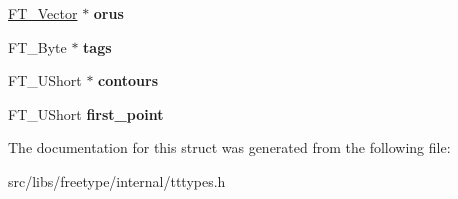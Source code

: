 \begin{DoxyCompactItemize}
\item 
\hypertarget{struct_t_t___glyph_zone_rec___a4b4193dbae177435cb6515f9a0537fa0}{
\hyperlink{struct_f_t___vector__}{FT\_\-Vector} $\ast$ {\bfseries orus}}
\label{struct_t_t___glyph_zone_rec___a4b4193dbae177435cb6515f9a0537fa0}

\item 
\hypertarget{struct_t_t___glyph_zone_rec___ae816c5c1096e333741d3f3f9d3ae0a8f}{
FT\_\-Byte $\ast$ {\bfseries tags}}
\label{struct_t_t___glyph_zone_rec___ae816c5c1096e333741d3f3f9d3ae0a8f}

\item 
\hypertarget{struct_t_t___glyph_zone_rec___ad16498cac0d4d233dce009eb74d63de1}{
FT\_\-UShort $\ast$ {\bfseries contours}}
\label{struct_t_t___glyph_zone_rec___ad16498cac0d4d233dce009eb74d63de1}

\item 
\hypertarget{struct_t_t___glyph_zone_rec___a9d655be80b3e31652f69ede54458faaf}{
FT\_\-UShort {\bfseries first\_\-point}}
\label{struct_t_t___glyph_zone_rec___a9d655be80b3e31652f69ede54458faaf}

\end{DoxyCompactItemize}


The documentation for this struct was generated from the following file:\begin{DoxyCompactItemize}
\item 
src/libs/freetype/internal/tttypes.h\end{DoxyCompactItemize}
